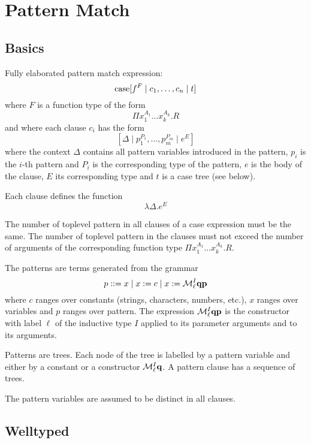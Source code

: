 \section{Pattern Match}

\subsection{Basics}

Fully elaborated pattern match expression:
$$
{\text{case}}[ f^F \mid c_1,  \ldots, c_n \mid t]
$$
%
where $F$ is a function type of the form
%
$$
\Pi x_1^{A_1} \ldots x_k^{A_k}. R
$$
%
and where each clause $c_i$ has the form
%
$$
    [\Delta \mid p_1^{P_1}, \ldots, p_m^{P_m} \mid e^E]
$$
where the context $\Delta$ contains all pattern variables introduced in the
pattern, $p_i$ is the $i$-th pattern
and $P_i$ is the corresponding type of the pattern, $e$ is the body of the
clause, $E$ its corresponding type and $t$ is a case tree (see below).

Each clause defines the function
$$
\lambda \Delta . e^E
$$

The number of toplevel pattern in all clauses of a case expression must be the
same. The number of toplevel pattern in the clauses must not exceed the number
of arguments of the corresponding function type $\Pi x_1^{A_1} \ldots x_k^{A_k}.
R$.


The patterns are terms generated from the grammar
$$
    p ::= x \mid x := c \mid x := {\cal M}^I_\ell {\mathbf q} {\mathbf p}
$$
where $c$ ranges over constants (strings, characters, numbers, etc.), $x$ ranges
over variables and $p$ ranges over pattern. The expression ${\cal M}^I_\ell {\mathbf q}
{\mathbf p}$ is the constructor with label $\ell$ of the inductive type $I$ applied to its
parameter arguments and to its arguments.

Patterns are trees. Each node of the tree is labelled by a pattern variable and
either by a constant or a constructor ${\cal M}^I_\ell {\mathbf q}$. A pattern clause has a
sequence of trees.

The pattern variables are assumed to be distinct in all clauses.



\subsection{Welltyped}

